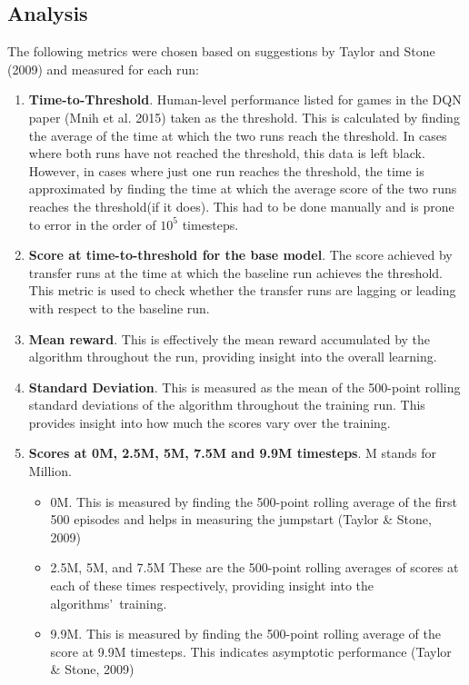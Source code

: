 \subsection*{Analysis}
The following metrics were chosen based on suggestions by Taylor and Stone (2009) and measured for each run: 
\begin{enumerate}
	\item \textbf{Time-to-Threshold}. Human-level performance listed for games in the DQN paper (Mnih et al. 2015) taken as the threshold. This is calculated by finding the average of the time at which the two runs reach the threshold. In cases where both runs have not reached the threshold, this data is left black. However, in cases where just one run reaches the threshold, the time is approximated by finding the time at which the average score of the two runs reaches the threshold(if it does). This had to be done manually and is prone to error in the order of $10^{5}$ timesteps.
	\item \textbf{Score at time-to-threshold for the base model}. The score achieved by transfer runs at the time at which the baseline run achieves the threshold. This metric is used to check whether the transfer runs are lagging or leading with respect to the baseline run.
	\item \textbf{Mean reward}. This is effectively the mean reward accumulated by the algorithm throughout the run, providing insight into the overall learning.
	\item \textbf{Standard Deviation}. This is measured as the mean of the 500-point rolling standard deviations of the algorithm throughout the training run. This provides insight into how much the scores vary over the training.
	\item \textbf{Scores at 0M, 2.5M, 5M, 7.5M and 9.9M timesteps}. M stands for Million.
	\begin{itemize}
		\item 0M. This is measured by finding the 500-point rolling average of the first 500 episodes and helps in measuring the jumpstart (Taylor \& Stone, 2009)
		\item 2.5M, 5M, and 7.5M These are the 500-point rolling averages of scores at each of these times respectively, providing insight into the algorithms\rq \  training.
		\item 9.9M. This is measured by finding the 500-point rolling average of the score at 9.9M timesteps. This indicates asymptotic performance (Taylor \& Stone, 2009)
	\end{itemize}
\end{enumerate}

